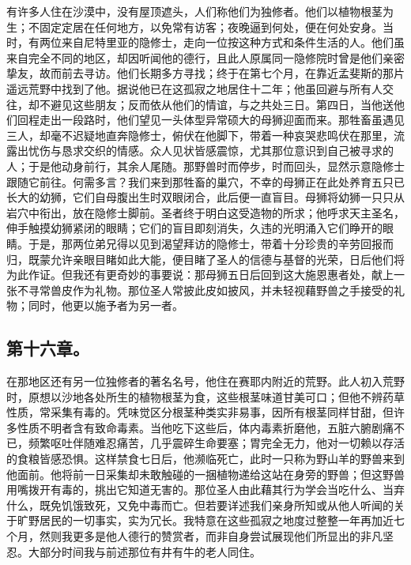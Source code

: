 有许多人住在沙漠中，没有屋顶遮头，人们称他们为独修者。他们以植物根茎为生；不固定定居在任何地方，以免常有访客；夜晚逼到何处，便在何处安身。当时，有两位来自尼特里亚的隐修士，走向一位按这种方式和条件生活的人。他们虽来自完全不同的地区，却因听闻他的德行，且此人原属同一隐修院时曾是他们亲密挚友，故而前去寻访。他们长期多方寻找；终于在第七个月，在靠近孟斐斯的那片遥远荒野中找到了他。据说他已在这孤寂之地居住十二年；他虽回避与所有人交往，却不避见这些朋友；反而依从他们的情谊，与之共处三日。第四日，当他送他们回程走出一段路时，他们望见一头体型异常硕大的母狮迎面而来。那牲畜虽遇见三人，却毫不迟疑地直奔隐修士，俯伏在他脚下，带着一种哀哭悲鸣伏在那里，流露出忧伤与恳求交织的情感。众人见状皆感震惊，尤其那位意识到自己被寻求的人；于是他动身前行，其余人尾随。那野兽时而停步，时而回头，显然示意隐修士跟随它前往。何需多言？我们来到那牲畜的巢穴，不幸的母狮正在此处养育五只已长大的幼狮，它们自母腹出生时双眼闭合，此后便一直盲目。母狮将幼狮一只只从岩穴中衔出，放在隐修士脚前。圣者终于明白这受造物的所求；他呼求天主圣名，伸手触摸幼狮紧闭的眼睛；它们的盲目即刻消失，久违的光明涌入它们睁开的眼睛。于是，那两位弟兄得以见到渴望拜访的隐修士，带着十分珍贵的辛劳回报而归，既蒙允许亲眼目睹如此大能，便目睹了圣人的信德与基督的光荣，日后他们将为此作证。但我还有更奇妙的事要说：那母狮五日后回到这大施恩惠者处，献上一张不寻常兽皮作为礼物。那位圣人常披此皮如披风，并未轻视藉野兽之手接受的礼物；同时，他更以施予者为另一者。\par


\subsection{第十六章。}

在那地区还有另一位独修者的著名名号，他住在赛耶内附近的荒野。此人初入荒野时，原想以沙地各处所生的植物根茎为食，这些根茎味道甘美可口；但他不辨药草性质，常采集有毒的。凭味觉区分根茎种类实非易事，因所有根茎同样甘甜，但许多性质不明者含有致命毒素。当他吃下这些后，体内毒素折磨他，五脏六腑剧痛不已，频繁呕吐伴随难忍痛苦，几乎震碎生命要塞；胃完全无力，他对一切赖以存活的食粮皆感恐惧。这样禁食七日后，他濒临死亡，此时一只称为野山羊的野兽来到他面前。他将前一日采集却未敢触碰的一捆植物递给这站在身旁的野兽；但这野兽用嘴拨开有毒的，挑出它知道无害的。那位圣人由此藉其行为学会当吃什么、当弃什么，既免饥饿致死，又免中毒而亡。但若要详述我们亲身所知或从他人听闻的关于旷野居民的一切事实，实为冗长。我特意在这些孤寂之地度过整整一年再加近七个月，然则我更多是他人德行的赞赏者，而非自身尝试展现他们所显出的非凡坚忍。大部分时间我与前述那位有井有牛的老人同住。\par

